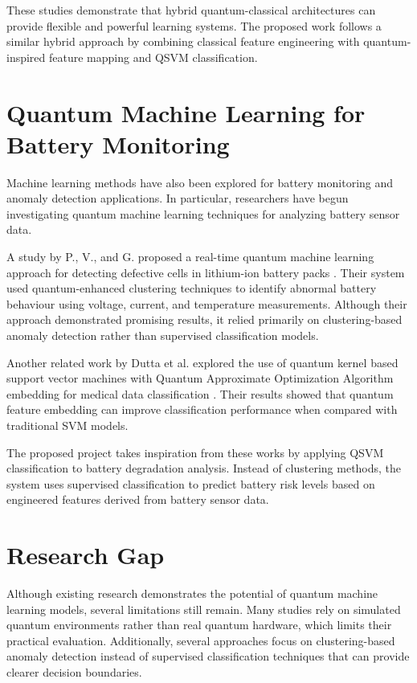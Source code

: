 These studies demonstrate that hybrid quantum-classical architectures can provide flexible and powerful learning systems. The proposed work follows a similar hybrid approach by combining classical feature engineering with quantum-inspired feature mapping and QSVM classification.

\section{Quantum Machine Learning for Battery Monitoring}

Machine learning methods have also been explored for battery monitoring and anomaly detection applications. In particular, researchers have begun investigating quantum machine learning techniques for analyzing battery sensor data.

A study by P., V., and G. proposed a real-time quantum machine learning approach for detecting defective cells in lithium-ion battery packs \cite{qml_battery_anomaly_2025}. Their system used quantum-enhanced clustering techniques to identify abnormal battery behaviour using voltage, current, and temperature measurements. Although their approach demonstrated promising results, it relied primarily on clustering-based anomaly detection rather than supervised classification models.

Another related work by Dutta et al. explored the use of quantum kernel based support vector machines with Quantum Approximate Optimization Algorithm embedding for medical data classification \cite{quantum_svm_cancer_2024}. Their results showed that quantum feature embedding can improve classification performance when compared with traditional SVM models.

The proposed project takes inspiration from these works by applying QSVM classification to battery degradation analysis. Instead of clustering methods, the system uses supervised classification to predict battery risk levels based on engineered features derived from battery sensor data.

\section{Research Gap}

Although existing research demonstrates the potential of quantum machine learning models, several limitations still remain. Many studies rely on simulated quantum environments rather than real quantum hardware, which limits their practical evaluation. Additionally, several approaches focus on clustering-based anomaly detection instead of supervised classification techniques that can provide clearer decision boundaries.

